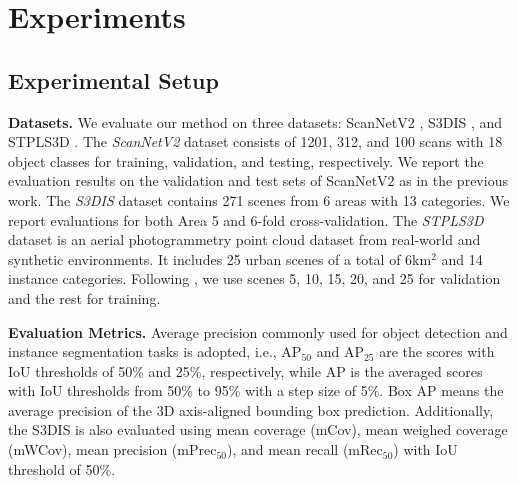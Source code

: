 \documentclass[10pt,twocolumn,letterpaper]{article}
\begin{document}
\section{Experiments}
\label{sec:experiments}
\subsection{Experimental Setup}
\noindent\textbf{Datasets.} We evaluate our method on three datasets: ScanNetV2 \cite{dai2017scannet}, S3DIS \cite{armeni2017joint}, and STPLS3D \cite{chen2022stpls3d}. The \textit{ScanNetV2} dataset consists of 1201, 312, and 100 scans with 18 object classes for training, validation, and testing, respectively. 
We report the evaluation results on the validation and test sets of ScanNetV2 as in the previous work. 
% 
The \textit{S3DIS} dataset contains 271 scenes from 6 areas with 13 categories. We report evaluations for both Area 5 and 6-fold cross-validation.
% 
The \textit{STPLS3D} dataset is an aerial photogrammetry point cloud dataset from real-world and synthetic environments. It includes 25 urban scenes of a total of 6km$^2$ and 14 instance categories. Following \cite{chen2021hierarchical,vu2022softgroup}, we use scenes 5, 10, 15, 20, and 25 for validation and the rest for training.

\noindent\textbf{Evaluation Metrics.} Average precision commonly used for object detection and instance segmentation tasks is adopted, i.e., AP$_{50}$ and AP$_{25}$ are the scores with IoU thresholds of 50\% and 25\%, respectively, while AP is the averaged scores with IoU thresholds from 50\% to 95\% with a step size of 5\%. Box AP means the average precision of the 3D axis-aligned bounding box prediction. Additionally, the S3DIS is also evaluated using mean coverage (mCov), mean weighed coverage (mWCov), mean precision (mPrec$_{50}$), and mean recall (mRec$_{50}$) with IoU threshold of 50\%.
\end{document}
